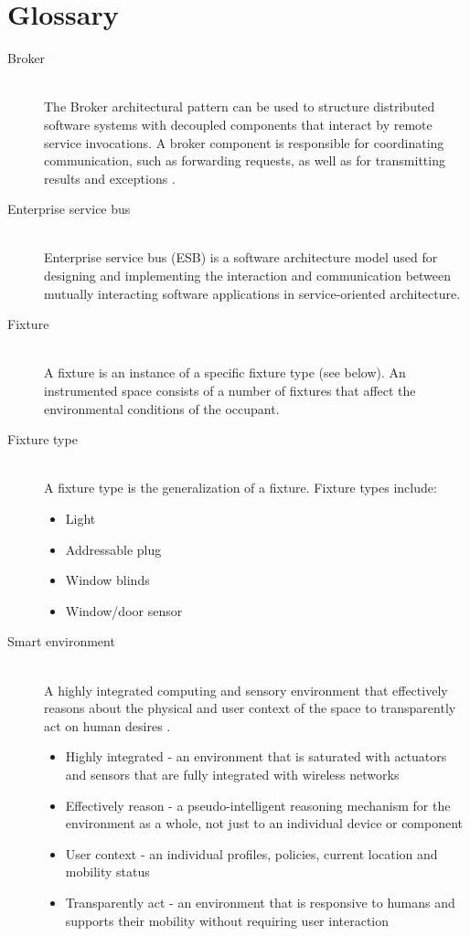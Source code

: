 \chapter{Glossary}
\begin{description}


\item[Broker] \hfill \\
 The Broker architectural pattern can be used to structure distributed software systems with decoupled components that interact by remote service invocations. A broker component is responsible for coordinating communication, such as forwarding requests, as well as for transmitting results and exceptions \cite{Buschmann}.
 

 
 \item[Enterprise service bus ] \hfill \\
   Enterprise service bus (ESB) is a software architecture model used for designing and implementing the interaction and communication between mutually interacting software applications in service-oriented architecture.
    
 
  \item[Fixture] \hfill \\
   A fixture is an instance of a specific fixture type (see below). An instrumented space consists of a number of fixtures that affect the environmental conditions of the occupant.

  \item[Fixture type] \hfill \\
  A fixture type is the generalization of a fixture. Fixture types include:
  \begin{itemize}
  	\item Light
  	\item Addressable plug
  	\item Window blinds
  	\item Window/door sensor
  \end{itemize}

 \item[Smart environment] \hfill \\
A highly integrated computing and sensory environment that effectively reasons about the physical and user context of the space to transparently act on human desires .
\begin{itemize}
\item Highly integrated - an environment that is saturated with actuators and sensors that are fully integrated with wireless networks
\item Effectively reason - a pseudo-intelligent reasoning mechanism for the environment as a whole, not just to an individual device or component 
\item User context - an individual profiles, policies, current location and mobility status
\item Transparently act - an environment that is responsive to humans and supports their mobility without requiring user interaction
\end{itemize}


\end{description}
